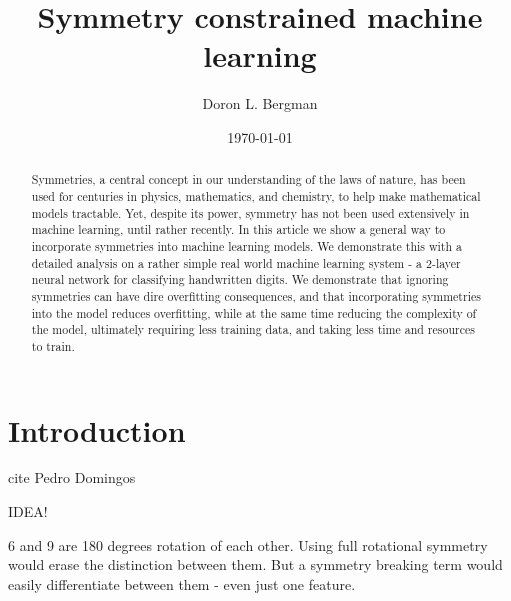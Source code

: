 \documentclass[twocolumn, prl]{revtex4-1}
\begin{document}
\newcommand{\trp}{^{\scriptsize \text{T}}}
\newcommand{\itp}{^{\scriptsize -\text{T}}}
\newcommand{\sqrtp}{^{\scriptsize \text{T/2}}}
\newcommand{\isqrtp}{^{\scriptsize -\text{T/2}}}
\newcommand{\inv}{^{\scriptsize -1}}
\newcommand{\sqr}{^{\scriptsize \text{1/2}}}
\newcommand{\invsqr}{^{\scriptsize -\text{1/2}}}

\newcommand{\be}{\begin{equation}}
\newcommand{\ee}{\end{equation}}


\title{Symmetry constrained machine learning}
\date{\today}

\author{Doron L. Bergman}

\begin{abstract}
Symmetries, a central concept in our understanding of the laws of nature, has been used for centuries in 
physics, mathematics, and chemistry, to help make mathematical models tractable. Yet, despite its power, symmetry has not been used extensively in machine learning, until rather recently. In this article we show a general way to incorporate symmetries into machine learning models. We demonstrate this with a detailed analysis on a rather simple real world machine learning system - a 2-layer neural network for classifying handwritten digits. We demonstrate that ignoring symmetries can have dire overfitting consequences, and that incorporating symmetries into the model reduces overfitting, while at the same time reducing the complexity of the model, ultimately requiring less training data, and taking less time and resources to train.
\end{abstract}

\maketitle


\section{Introduction}
\label{Sec:Intro}


cite Pedro Domingos

IDEA!

6 and 9 are 180 degrees rotation of each other. Using full rotational symmetry would erase the distinction between them. But a symmetry breaking term would easily differentiate between them - even just one feature.
\end{document}
